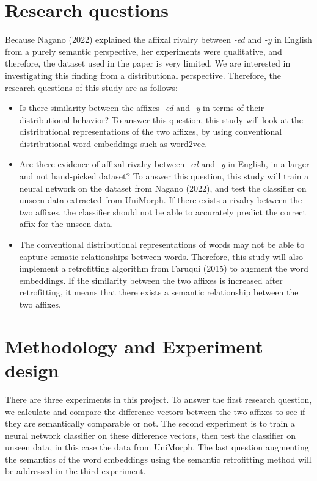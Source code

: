 \documentclass[12pt]{article}
\begin{document}
\section{Research questions}
    Because Nagano (2022) explained the affixal rivalry between \emph{-ed} and \emph{-y} in English from a purely semantic perspective, her experiments were qualitative, and therefore, the dataset used in the paper is very limited. We are interested in investigating this finding from a distributional perspective. Therefore, the research questions of this study are as follows:
    \begin{itemize}
        \item Is there similarity between the affixes \emph{-ed} and \emph{-y} in terms of their distributional behavior? To answer this question, this study will look at the distributional representations of the two affixes, by using conventional distributional word embeddings such as word2vec.
        \item Are there evidence of affixal rivalry between \emph{-ed} and \emph{-y} in English, in a larger and not hand-picked dataset? To answer this question, this study will train a neural network on the dataset from Nagano (2022), and test the classifier on unseen data extracted from UniMorph. If there exists a rivalry between the two affixes, the classifier should not be able to accurately predict the correct affix for the unseen data.
        \item The conventional distributional representations of words may not be able to capture sematic relationships between words. Therefore, this study will also implement a retrofitting algorithm from Faruqui (2015) to augment the word embeddings. If the similarity between the two affixes is increased after retrofitting, it means that there exists a semantic relationship between the two affixes.
    \end{itemize}

\section{Methodology and Experiment design}
There are three experiments in this project. To answer the first research question, we calculate and compare the difference vectors between the two affixes to see if they are semantically comparable or not. The second experiment is to train a neural network classifier on these difference vectors, then test the classifier on unseen data, in this case the data from UniMorph. The last question augmenting the semantics of the word embeddings using the semantic retrofitting method will be addressed in the third experiment.
\end{document}
